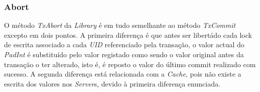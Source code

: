 \subsubsection{Abort}
\label{abort}

O método \textit{TxAbort} da \textit{Library} é em tudo semelhante ao método \textit{TxCommit} excepto em dois pontos. A primeira diferença é que antes ser libertádo cada lock de escrita associado a cada \textit{UID} referenciado pela transação, o valor actual do \textit{PadInt} é substituído pelo valor registado como sendo o valor original antes da transação o ter alterado, isto é, é reposto o valor do último commit realizado com sucesso. A segunda diferença está relacionada com a \textit{Cache}, pois não existe a escrita dos valores nos \textit{Server}s, devido à primeira diferença enunciada.

